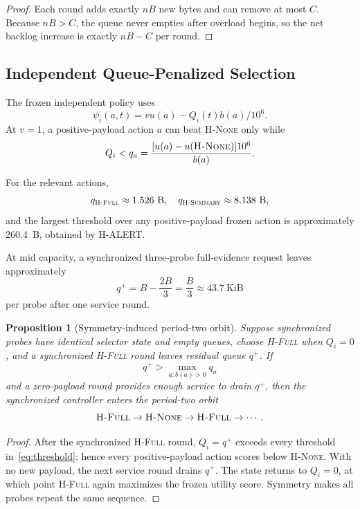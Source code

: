 \documentclass[10pt,journal]{IEEEtran}
\newtheorem{proposition}{Proposition}
\newcommand{\Hnone}{\textsc{H-None}}
\newcommand{\Hsummary}{\textsc{H-Summary}}
\newcommand{\Hfull}{\textsc{H-Full}}
\begin{document}
\begin{proof}
Each round adds exactly $nB$ new bytes and can remove at most $C$.
Because $nB>C$, the queue never empties after overload begins, so the
net backlog increase is exactly $nB-C$ per round.
\end{proof}

\subsection{Independent Queue-Penalized Selection}

The frozen independent policy uses
\begin{equation}
\psi_i(a,t)
=
v u(a)-Q_i(t)b(a)/10^6 .
\end{equation}
At $v=1$, a positive-payload action $a$ can beat \Hnone{} only while
\begin{equation}
Q_i
<
q_a
=
\frac{[u(a)-u(\Hnone)]10^6}{b(a)} .
\label{eq:threshold}
\end{equation}

For the relevant actions,
\[
q_{\Hfull}\approx1.526~\mathrm{B},
\quad
q_{\Hsummary}\approx8.138~\mathrm{B},
\]
and the largest threshold over any positive-payload frozen action is
approximately 260.4~B, obtained by H-ALERT.

At mid capacity, a synchronized three-probe full-evidence request leaves
approximately
\begin{equation}
q^+
=
B-\frac{2B}{3}
=
\frac{B}{3}
\approx43.7~\mathrm{KiB}
\end{equation}
per probe after one service round.

\begin{proposition}[Symmetry-induced period-two orbit]
\label{prop:cycle}
Suppose synchronized probes have identical selector state and empty
queues, choose \Hfull{} when $Q_i=0$, and a synchronized \Hfull{} round
leaves residual queue $q^+$. If
\begin{equation}
q^+>\max_{a:b(a)>0} q_a
\end{equation}
and a zero-payload round provides enough service to drain $q^+$, then
the synchronized controller enters the period-two orbit
\begin{equation}
\Hfull
\rightarrow
\Hnone
\rightarrow
\Hfull
\rightarrow\cdots .
\end{equation}
\end{proposition}

\begin{proof}
After the synchronized \Hfull{} round, $Q_i=q^+$ exceeds every threshold
in~\eqref{eq:threshold}; hence every positive-payload action scores below
\Hnone{}. With no new payload, the next service round drains $q^+$.
The state returns to $Q_i=0$, at which point \Hfull{} again maximizes the
frozen utility score. Symmetry makes all probes repeat the same sequence.
\end{proof}
\end{document}
